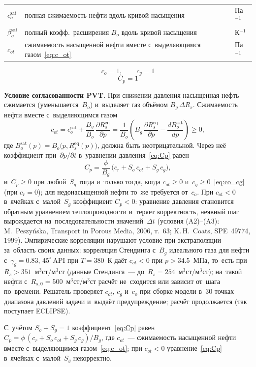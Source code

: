 \documentclass[12pt,a4paper]{article}
\newcommand{\csat}{c_o^{\mathrm{sat}}}
\newcommand{\bsat}{\beta_o^{\mathrm{sat}}}
\begin{document}

\begin{tabular}{lll}
$\csat$       & полная сжимаемость нефти вдоль кривой насыщения & Па$^{-1}$ \\
$\bsat$       & полный коэфф.\ расширения $B_o$ вдоль кривой насыщения & К$^{-1}$ \\
$c_{ot}$      & сжимаемость насыщенной нефти вместе с~выделяющимся газом~\eqref{eq:c_ot} & Па$^{-1}$ \\
\end{tabular}

\begin{equation}\label{eq:co_cg}
  c_o = 1, \qquad c_g = 1
\end{equation}
\begin{equation}\label{eq:Cp}
  C_p = 1
\end{equation}

\textbf{Условие согласованности PVT.} При снижении давления насыщенная
нефть сжимается (уменьшается~$B_o$) и~выделяет газ объёмом
$B_g\,\Delta R_s$. Сжимаемость нефти вместе с~выделяющимся газом
\begin{equation}\label{eq:c_ot}
  \boxed{
    c_{ot} = \csat + \frac{B_g}{B_o}\,\frac{\partial R_s^{\text{eq}}}{\partial p}
    = \frac{1}{B_o}\left(B_g\,\frac{\partial R_s^{\text{eq}}}{\partial p}
      - \frac{d B_o^{\text{sat}}}{d p}\right) \ge 0,
  }
\end{equation}
где $B_o^{\text{sat}}(p) = B_o\bigl(p, R_s^{\text{eq}}(p)\bigr)$, должна быть
неотрицательной. Через неё коэффициент при~$\partial p/\partial t$
в~уравнении давления~\eqref{eq:Cp} равен
\[
  C_p = \frac{\phi}{B_g}\,\bigl(c_r + S_o\,c_{ot} + S_g\,c_g\bigr),
\]
и~$C_p \ge 0$ при любой~$S_g$ тогда и~только тогда, когда
$c_{ot} \ge 0$ и~$c_g \ge 0$~\eqref{eq:co_cg} (при $c_r = 0$); для
недонасыщенной нефти то~же требуется от~$c_o$. При $c_{ot} < 0$ в~ячейках
с~малой~$S_g$ коэффициент $C_p < 0$: уравнение давления становится обратным
уравнением теплопроводности и~теряет корректность, неявный шаг вырождается
на~последовательности значений~$\Delta t$ (условия (A2)--(A3):
M.~Peszy\'nska, Transport in Porous Media, 2006, т.~63; K.\,H.~Coats,
SPE~49774, 1999). Эмпирические корреляции нарушают условие при экстраполяции
за~область своих данных: корреляция Стендинга с~$B_g$ идеального газа для
нефти с~$\gamma_g = 0.83$, $45^\circ$\,API при $T = 380$~К даёт
$c_{ot} < 0$ при $p > 34.5$~МПа, то~есть при $R_s > 351$~м$^3$ст/м$^3$ст
(данные Стендинга~--- до~$R_s = 254$~м$^3$ст/м$^3$ст); на~такой нефти
с~$R_{s,0} = 500$~м$^3$ст/м$^3$ст расчёт не~сходится или зависит от~шага
по~времени. Решатель проверяет $c_{ot}$, $c_g$ и~$c_o$ при сборке модели
в~30 точках диапазона давлений задачи и~выдаёт предупреждение; расчёт
продолжается (так поступает ECLIPSE).

С~учётом $S_o + S_g = 1$ коэффициент~\eqref{eq:Cp} равен
$C_p = \phi\,(c_r + S_o\,c_{ot} + S_g\,c_g)/B_g$, где $c_{ot}$~---
сжимаемость насыщенной нефти вместе с~выделяющимся газом~\eqref{eq:c_ot};
при $c_{ot} < 0$ уравнение~\eqref{eq:Cp} в~ячейках с~малой~$S_g$ некорректно.
\end{document}
